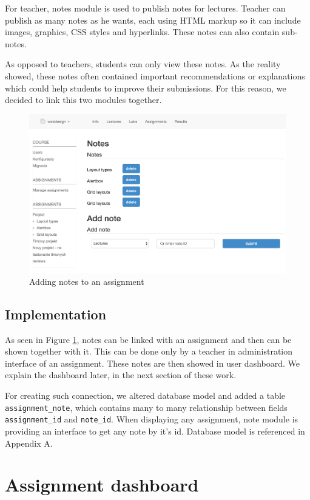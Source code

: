 For teacher, notes module is used to publish notes for lectures. Teacher can publish as many notes as he wants, each using HTML markup so it can include images, graphics, CSS styles and hyperlinks. These notes can also contain sub-notes.

As opposed to teachers, students can only view these notes. As the reality showed, these notes often contained important recommendations or explanations which could help students to improve their submissions. For this reason, we decided to link this two modules together.

\begin{figure}[h]
    \centering
    \includegraphics[width=\textwidth]{images/notes.png}
    \caption{Adding notes to an assignment}
    \label{assignmentnote}
\end{figure}

\subsection{Implementation}
As seen in Figure \ref{assignmentnote}, notes can be linked with an assignment and then can be shown together with it. This can be done only by a teacher in administration interface of an assignment. These notes are then showed in user dashboard. We explain the dashboard later, in the next section of these work.

For creating such connection, we altered database model and added a table \texttt{assignment\_note}, which contains many to many relationship between fields \texttt{assignment\_id} and \texttt{note\_id}. When displaying any assignment, note module is providing an interface to get any note by it's id. Database model is referenced in Appendix A.


\section{Assignment dashboard}

